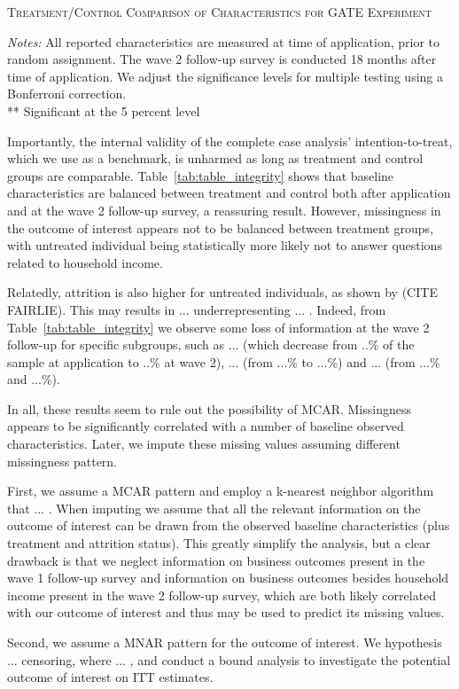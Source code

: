 \begin{table}[t!]
\centering
\caption{\textsc{Treatment/Control Comparison of Characteristics for GATE Experiment}}
\begin{adjustbox}{width=\textwidth, totalheight=\textheight, keepaspectratio}

\end{adjustbox}


\label{tab:table_integrity}
\medskip
\raggedright
\footnotesize
\textit{Notes:} All reported characteristics are measured at time of application, prior to random assignment. The wave 2 follow-up survey is conducted 18 months after time of application. We adjust the significance levels for multiple testing using a Bonferroni correction. \\
** Significant at the 5 percent level
\end{table}

Importantly, the internal validity of the complete case analysis' intention-to-treat, which we use as a benchmark, is unharmed as long as treatment and control groups are comparable. Table~\ref{tab:table_integrity} shows that baseline characteristics are balanced between treatment and control both after application and at the wave 2 follow-up survey, a reassuring result. However, missingness in the outcome of interest appears not to be balanced between treatment groups, with untreated individual being statistically more likely not to answer questions related to household income.

Relatedly, attrition is also higher for untreated individuals, as shown by (CITE FAIRLIE). This may results in ... underrepresenting ... . Indeed, from Table~\ref{tab:table_integrity} we observe some loss of information at the wave 2 follow-up for specific subgroups, such as ... (which decrease from ..\% of the sample at application to ..\% at wave 2), ... (from ...\% to ...\%) and ... (from ...\% and ...\%).

In all, these results seem to rule out the possibility of MCAR. Missingness appears to be significantly correlated with a number of baseline observed characteristics. Later, we impute these missing values assuming different missingness pattern.

First, we assume a MCAR pattern and employ a k-nearest neighbor algorithm that ... . When imputing we assume that all the relevant information on the outcome of interest can be drawn from the observed baseline characteristics (plus treatment and attrition status). This greatly simplify the analysis, but a clear drawback is that we neglect information on business outcomes present in the wave 1 follow-up survey and information on business outcomes besides household income present in the wave 2 follow-up survey, which are both likely correlated with our outcome of interest and thus may be used to predict its missing values.

Second, we assume a MNAR pattern for the outcome of interest. We hypothesis ... censoring, where ... , and conduct a bound analysis to investigate the potential outcome of interest on ITT estimates.




